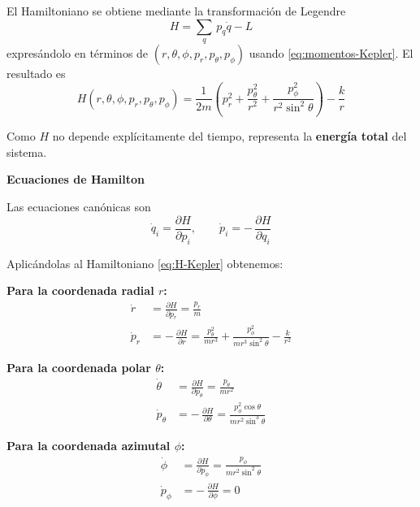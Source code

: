 \documentclass{article}
\begin{document}
El Hamiltoniano se obtiene mediante la transformación de Legendre
\[
H = \sum_{q}\,p_{q}\dot q - L
\]
expresándolo en términos de $(r,\theta,\phi,p_{r},p_{\theta},p_{\phi})$ usando
\eqref{eq:momentos-Kepler}. El resultado es
\begin{equation}
H(r,\theta,\phi,p_{r},p_{\theta},p_{\phi})
=
\frac{1}{2m}\left(
p_{r}^{2}
+ \frac{p_{\theta}^{2}}{r^{2}}
+ \frac{p_{\phi}^{2}}{r^{2}\sin^{2}\theta}
\right)
- \frac{k}{r}
\label{eq:H-Kepler}
\end{equation}

Como $H$ no depende explícitamente del tiempo, representa la \textbf{energía
total} del sistema.

\textcolor{trueblue}{\textbf{Ecuaciones de Hamilton}}

Las ecuaciones canónicas son
\[
\dot q_{i} = \frac{\partial H}{\partial p_{i}},
\qquad
\dot p_{i} = -\,\frac{\partial H}{\partial q_{i}}
\]

Aplicándolas al Hamiltoniano \eqref{eq:H-Kepler} obtenemos:

\medskip
\textbf{Para la coordenada radial $r$:}
\begin{equation}
\begin{split}
\dot r &= \frac{\partial H}{\partial p_{r}}
       = \frac{p_{r}}{m} \\[4pt]
\dot p_{r} &= -\,\frac{\partial H}{\partial r}
          = \frac{p_{\theta}^{2}}{m r^{3}}
            + \frac{p_{\phi}^{2}}{m r^{3}\sin^{2}\theta}
            - \frac{k}{r^{2}}
\end{split}
\label{eq:Ham-r}
\end{equation}

\textbf{Para la coordenada polar $\theta$:}
\begin{equation}
\begin{split}
\dot\theta &= \frac{\partial H}{\partial p_{\theta}}
           = \frac{p_{\theta}}{m r^{2}} \\[4pt]
\dot p_{\theta} &= -\,\frac{\partial H}{\partial\theta}
               = \frac{p_{\phi}^{2}\cos\theta}{m r^{2}\sin^{3}\theta}
\end{split}
\label{eq:Ham-theta}
\end{equation}

\textbf{Para la coordenada azimutal $\phi$:}
\begin{equation}
\begin{split}
\dot\phi &= \frac{\partial H}{\partial p_{\phi}}
        = \frac{p_{\phi}}{m r^{2}\sin^{2}\theta} \\[4pt]
\dot p_{\phi} &= -\,\frac{\partial H}{\partial\phi}
             = 0
\end{split}
\label{eq:Ham-phi}
\end{equation}
\end{document}
